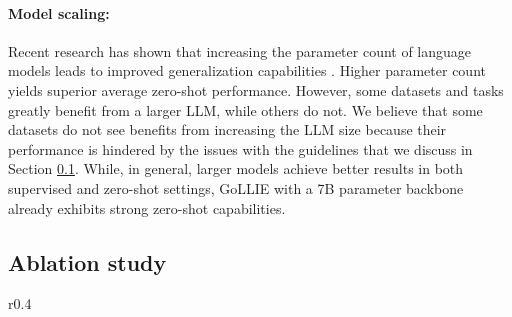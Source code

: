 \paragraph{Model scaling:} Recent research has shown that increasing the parameter count of language models leads to improved generalization capabilities \cite{DBLP:conf/nips/BrownMRSKDNSSAA20}. Higher parameter count yields superior average zero-shot performance. However, some datasets and tasks greatly benefit from a larger LLM, while others do not. We believe that some datasets do not see benefits from increasing the LLM size because their performance is hindered by the issues with the guidelines that we discuss in Section \ref{sec:Ablation}. While, in general, larger models achieve better results in both supervised and zero-shot settings, GoLLIE with a 7B parameter backbone already exhibits strong zero-shot capabilities. %

\subsection{Ablation study}
\label{sec:Ablation}

\begin{wraptable}{r}{0.4\textwidth}
    \centering
    \vspace{-2.2em}
    \caption{Ablation results.}
    \vspace{-.5em}
    \label{tab:ablation}

\end{wraptable}

